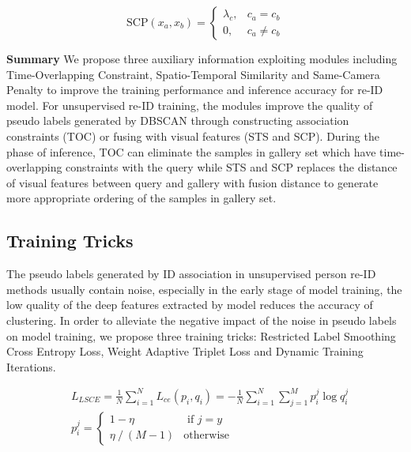 \documentclass[10pt,twocolumn,letterpaper]{article}
\begin{document}
\begin{equation}
    \mathrm{SCP}\left(x_{a}, x_{b}\right)= \begin{cases}\lambda_{c}, & c_{a}=c_{b} \\ 0, & c_{a} \neq c_{b}\end{cases}
    \label{eq:scp}
\end{equation}

\noindent \textbf{Summary}
We propose three auxiliary information exploiting modules including Time-Overlapping Constraint, Spatio-Temporal Similarity and Same-Camera Penalty to improve the training performance and inference accuracy for re-ID model. For unsupervised re-ID training, the modules improve the quality of pseudo labels generated by DBSCAN through constructing association constraints (TOC) or fusing with visual features (STS and SCP). During the phase of inference, TOC can eliminate the samples in gallery set which have time-overlapping constraints with the query while STS and SCP replaces the distance of visual features between query and gallery with fusion distance to generate more appropriate ordering of the samples in gallery set.

\subsection{Training Tricks}

The pseudo labels generated by ID association in unsupervised person re-ID methods usually contain noise, especially in the early stage of model training, the low quality of the deep features extracted by model reduces the accuracy of clustering. In order to alleviate the negative impact of the noise in pseudo labels on model training, we propose three training tricks: Restricted Label Smoothing Cross Entropy Loss, Weight Adaptive Triplet Loss and Dynamic Training Iterations.

\begin{equation}
    \begin{aligned}
     &L_{L S C E}=\frac{1}{N} \sum_{i=1}^{N} L_{ce}\left(p_{i}, q_{i}\right)=-\frac{1}{N} \sum_{i=1}^{N} \sum_{j=1}^{M} p_{i}^{j} \log q_{i}^{j} \\
     &p_{i}^{j}= \begin{cases}1-\eta & \text { if } j=y \\ \eta \ /\ (M-1) & \text {otherwise}\end{cases}
    \end{aligned}
    \label{eq:lsce}
\end{equation}
\end{document}
